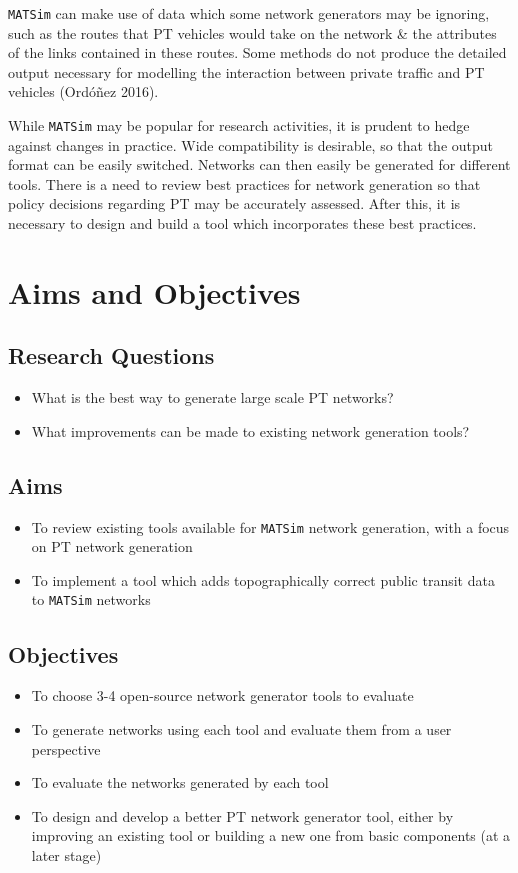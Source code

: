 \documentclass[11pt]{article}
\makeatletter
\newcommand{\citeprocitem}[2]{\hyper@linkstart{cite}{citeproc_bib_item_#1}#2\hyper@linkend}
\makeatother
\begin{document}
\texttt{MATSim} can make use of data which some network generators may be ignoring, such as the routes that PT vehicles would take on the network \& the attributes of the links contained in these routes. Some methods do not produce the detailed output necessary for modelling the interaction between private traffic and PT vehicles (\citeprocitem{10}{Ordóñez 2016}).

While \texttt{MATSim} may be popular for research activities, it is prudent to hedge against changes in practice. Wide compatibility is desirable, so that the output format can be easily switched. Networks can then easily be generated for different tools.
There is a need to review best practices for network generation so that policy decisions regarding PT may be accurately assessed. After this, it is necessary to design and build a tool which incorporates these best practices.
\section{Aims and Objectives}
\label{sec:org32704bf}
\subsection{Research Questions}
\label{sec:orgc693b8a}
\begin{itemize}
\item What is the best way to generate large scale PT networks?
\item What improvements can be made to existing network generation tools?
\end{itemize}
\subsection{Aims}
\label{sec:org8a8e2cf}
\begin{itemize}
\item To review existing tools available for \texttt{MATSim} network generation, with a focus on PT network generation
\item To implement a tool which adds topographically correct public transit data to \texttt{MATSim} networks
\end{itemize}
\subsection{Objectives}
\label{sec:org36d457f}
\begin{itemize}
\item To choose 3-4 open-source network generator tools to evaluate
\item To generate networks using each tool and evaluate them from a user perspective
\item To evaluate the networks generated by each tool
\item To design and develop a better PT network generator tool, either by improving an existing tool or building a new one from basic components (at a later stage)
\end{itemize}
\end{document}

